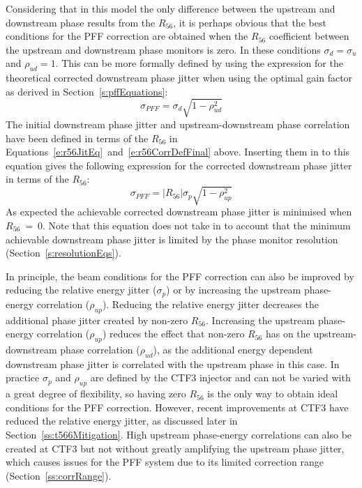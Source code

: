 Considering that in this model the only difference between the upstream and downstream phase results from the \(R_{56}\), it is perhaps obvious that the best conditions for the PFF correction are obtained when the \(R_{56}\) coefficient between the upstream and downstream phase monitors is zero. In these conditions \(\sigma_d = \sigma_u\) and \(\rho_{ud} = 1\). This can be more formally defined by using the expression for the theoretical corrected downstream phase jitter when using the optimal gain factor as derived in Section~\ref{s:pffEquations}:
\begin{equation}
\sigma_{PFF} = \sigma_d\sqrt{1-\rho_{ud}^2}
\end{equation}
The initial downstream phase jitter and upstream-downstream phase correlation have been defined in terms of the \(R_{56}\) in Equations~\ref{e:r56JitEq}~and~\ref{e:r56CorrDefFinal} above. Inserting them in to this equation gives the following expression for the corrected downstream phase jitter in terms of the \(R_{56}\):
\begin{equation}
\sigma_{PFF} = \left|R_{56}\right|\sigma_p\sqrt{1-\rho_{up}^2}
\label{e:r56PFFJit}
\end{equation}
As expected the achievable corrected downstream phase jitter is minimised when \(R_{56}~=~0\). Note that this equation does not take in to account that the minimum achievable downstream phase jitter is limited by the phase monitor resolution (Section~\ref{s:resolutionEqs}).

In principle, the beam conditions for the PFF correction can also be improved by reducing the relative energy jitter (\(\sigma_p\)) or by increasing the upstream phase-energy correlation (\(\rho_{up}\)). Reducing the relative energy jitter decreases the additional phase jitter created by non-zero \(R_{56}\). Increasing the upstream phase-energy correlation (\(\rho_{up}\)) reduces the effect that non-zero \(R_{56}\) has on the upstream-downstream phase correlation (\(\rho_{ud}\)), as the additional energy dependent downstream phase jitter is correlated with the upstream phase in this case. 
In practice \(\sigma_p\) and \(\rho_{up}\) are defined by the CTF3 injector and can not be varied with a great degree of flexibility, so having zero \(R_{56}\) is the only way to obtain ideal conditions for the PFF correction. However, recent improvements at CTF3 have reduced the relative energy jitter, as discussed later in Section~\ref{ss:t566Mitigation}. High upstream phase-energy correlations can also be created at CTF3 but not without greatly amplifying the upstream phase jitter, which causes issues for the PFF system due to its limited correction range (Section~\ref{ss:corrRange}).


